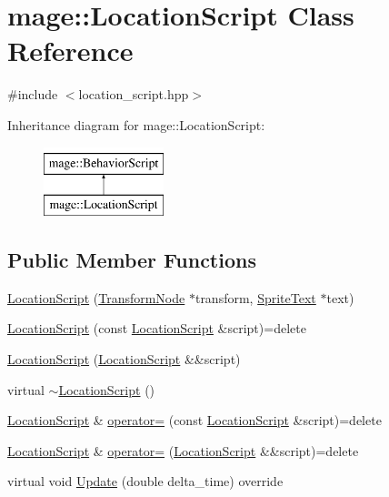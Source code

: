 \hypertarget{classmage_1_1_location_script}{}\section{mage\+:\+:Location\+Script Class Reference}
\label{classmage_1_1_location_script}


{\ttfamily \#include $<$location\+\_\+script.\+hpp$>$}

Inheritance diagram for mage\+:\+:Location\+Script\+:\begin{figure}[H]
\begin{center}
\leavevmode
\includegraphics[height=2.000000cm]{classmage_1_1_location_script}
\end{center}
\end{figure}
\subsection*{Public Member Functions}
\begin{DoxyCompactItemize}
\item 
\hyperlink{classmage_1_1_location_script_ae4150c94a0ac7524875596a6cbce4fe4}{Location\+Script} (\hyperlink{structmage_1_1_transform_node}{Transform\+Node} $\ast$transform, \hyperlink{classmage_1_1_sprite_text}{Sprite\+Text} $\ast$text)
\item 
\hyperlink{classmage_1_1_location_script_a53fb0562896eadb4c747d53b53f65b40}{Location\+Script} (const \hyperlink{classmage_1_1_location_script}{Location\+Script} \&script)=delete
\item 
\hyperlink{classmage_1_1_location_script_a6cddb54a11e5d5d6dee034ef04ffbf2f}{Location\+Script} (\hyperlink{classmage_1_1_location_script}{Location\+Script} \&\&script)
\item 
virtual \hyperlink{classmage_1_1_location_script_a95ed60a4bd7d228cc28ce1622f254d75}{$\sim$\+Location\+Script} ()
\item 
\hyperlink{classmage_1_1_location_script}{Location\+Script} \& \hyperlink{classmage_1_1_location_script_a49409b091dbd1b93830c46831be453fb}{operator=} (const \hyperlink{classmage_1_1_location_script}{Location\+Script} \&script)=delete
\item 
\hyperlink{classmage_1_1_location_script}{Location\+Script} \& \hyperlink{classmage_1_1_location_script_a6e2ad5cd12a984d38c66bbcc81fef94b}{operator=} (\hyperlink{classmage_1_1_location_script}{Location\+Script} \&\&script)=delete
\item 
virtual void \hyperlink{classmage_1_1_location_script_a3ffe0474c573e2cf858aee62056324a3}{Update} (double delta\+\_\+time) override
\end{DoxyCompactItemize}
